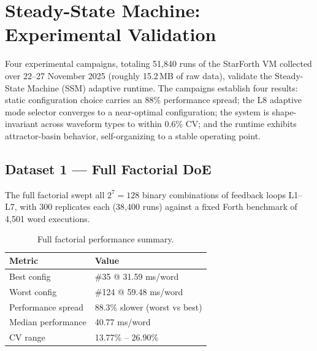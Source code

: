 
\section{Steady-State Machine: Experimental Validation}


Four experimental campaigns, totaling 51{,}840 runs of the StarForth VM collected
over 22--27 November 2025 (roughly 15.2\,MB of raw data), validate the
Steady-State Machine (SSM) adaptive runtime. The campaigns establish four
results: static configuration choice carries an 88\% performance spread; the L8
adaptive mode selector converges to a near-optimal configuration; the system is
shape-invariant across waveform types to within 0.6\% CV; and the runtime
exhibits attractor-basin behavior, self-organizing to a stable operating point.

\subsection{Dataset 1 --- Full Factorial DoE}

The full factorial swept all $2^7 = 128$ binary combinations of feedback loops
L1--L7, with 300 replicates each (38{,}400 runs) against a fixed Forth benchmark
of 4{,}501 word executions.

\begin{table}[ht]
\centering
\small
\begin{tabular}{ll}
\toprule
Metric & Value \\
\midrule
Best config & \#35 @ 31.59 ms/word \\
Worst config & \#124 @ 59.48 ms/word \\
Performance spread & 88.3\% slower (worst vs best) \\
Median performance & 40.77 ms/word \\
CV range & 13.77\% -- 26.90\% \\
\bottomrule
\end{tabular}
\caption{Full factorial performance summary.}
\end{table}

